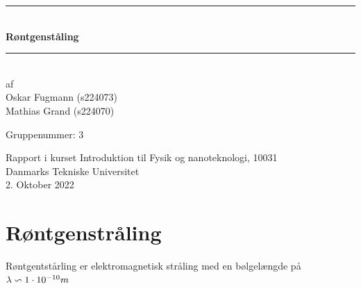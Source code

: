 \documentclass[a4paper,twoside]{article}
\begin{document}
\begin{titlepage}
\centering

\rule{\textwidth}{1mm}\\
\vspace{1cm}
\Huge\bfseries Røntgenståling\\
\vspace{0.7cm}
\rule{\textwidth}{1mm}\\
\vspace{3cm}
\large af\\
Oskar Fugmann (s224073)\\
Mathias Grand (s224070)\\


\vspace{0.7cm}


Gruppenummer: 3
\normalsize
\begin{flushleft}
Rapport i kurset Introduktion til Fysik og nanoteknologi, 10031\\
Danmarks Tekniske Universitet\\
2. Oktober 2022
\end{flushleft}
\end{titlepage}

\tableofcontents
\thispagestyle{empty} 
\newpage %

\section{Røntgenstråling}
\setcounter{page}{1} 

Røntgentstårling er elektromagnetisk stråling med en bølgelængde på\
$\lambda \backsim 1\cdot 10^{-10}m\\$
\end{document}
